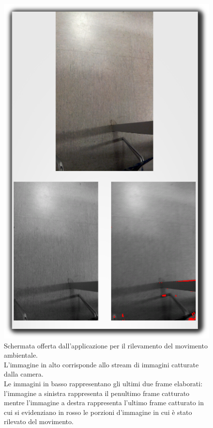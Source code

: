 \begin{figure}[!ht]
\begin{center}
\begin{minipage}[r]{.5\textwidth}
\includegraphics[scale=.3]{./../wireless/resources/camera.png}
\end{minipage}
\begin{minipage}[l]{.4\textwidth}
\caption{Schermata offerta dall'applicazione per il rilevamento del movimento ambientale.\\ L'immagine in alto corrisponde allo stream di immagini catturate dalla camera.\\ Le immagini in basso rappresentano gli ultimi due frame elaborati: l'immagine a sinistra rappresenta il penultimo frame catturato mentre l'immagine a destra rappresenta l'ultimo frame catturato in cui si evidenziano in rosso le porzioni d'immagine in cui è stato rilevato del movimento.}
\label{fig:motionDetection}
\end{minipage}
\end{center}
\end{figure}


